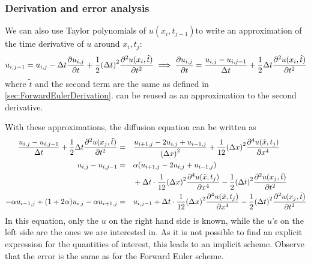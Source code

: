 \documentclass[12pt,english,a4paper]{article}
\begin{document}
\subsubsection{Derivation and error analysis}
We can also use Taylor polynomials of \(u(x_i,t_{j-1})\)to write an approximation of the time derivative of \(u\) around \(x_i,t_j\):
\[
    u_{i,j-1} = u_{i,j} - \Delta t\pdv{u_{i,j}}{t} + \frac{1}{2}\qty(\Delta t)^2\pdv[2]{u(x_i,\tilde{t})}{t}
    \implies \pdv{u_{i,j}}{t} = \frac{u_{i,j}-u_{i,j-1}}{\Delta t} + \frac{1}{2}\Delta t\pdv[2]{u(x_i,\tilde{t})}{t}
\]
where \(\tilde{t}\) and the second term are the same as defined in \vref{sec:ForwardEulerDerivation}.  can be reused as an approximation to the second derivative.

With these approximations, the diffusion equation can be written as
\begin{alignat*}{2}
    \frac{u_{i,j}-u_{i,j-1}}{\Delta t} + \frac{1}{2}\Delta t\pdv[2]{u(x_j,\tilde{t})}{t}
    &=&& \frac{u_{i+1,j}  - 2u_{i,j} + u_{i-1,j}}{\qty(\Delta x)^2} + \frac{1}{12}\qty(\Delta x)^2\pdv[4]{u(\tilde{x},t_j)}{x}  \\
    u_{i,j}-u_{i,j-1} &=&& \alpha(u_{i+1,j}  - 2u_{i,j} + u_{i-1,j})\\
    &&& + \Delta t\cdot \frac{1}{12}\qty(\Delta x)^2\pdv[4]{u(\tilde{x},t_j)}{x}  - \frac{1}{2}\qty(\Delta t)^2\pdv[2]{u(x_j,\tilde{t})}{t}\\
    -\alpha u_{i-1,j} + \qty(1+2\alpha)u_{i,j} - \alpha u_{i+1,j} &=&& u_{i,j-1} + \Delta t\cdot \frac{1}{12}\qty(\Delta x)^2\pdv[4]{u(\tilde{x},t_j)}{x}  - \frac{1}{2}\qty(\Delta t)^2\pdv[2]{u(x_j,\tilde{t})}{t}
\end{alignat*}
In this equation, only the \(u\) on the right hand side is known, while the \(u\)'s on the left side are the ones we are interested in. As it is not possible to find an explicit expression for the quantities of interest, this leads to an implicit scheme. Observe that the error is the same as for the Forward Euler scheme.
\end{document}

